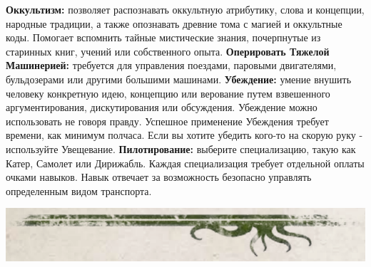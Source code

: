 \documentclass[letterpaper,twocolumn,openany, twoside, 11pt, usenames]{cocbook}
\begin{document}
\begin{fullcocpaperbox}{}{}
\begin{multicols}{3}
  \smallbreak
  \textbf{Оккультизм:} позволяет распознавать оккультную атрибутику, слова и концепции, народные традиции, а также опознавать древние тома с магией и оккультные коды. Помогает вспомнить тайные мистические знания, почерпнутые из старинных книг, учений или собственного опыта.
  \smallbreak
  \textbf{Оперировать Тяжелой Машинерией:} требуется для управления поездами, паровыми двигателями, бульдозерами или другими большими машинами.
  \smallbreak
  \textbf{Убеждение:} умение внушить человеку конкретную идею, концепцию или верование путем взвешенного аргументирования, дискутирования или обсуждения. Убеждение можно использовать не говоря правду. Успешное применение Убеждения требует времени, как минимум полчаса. Если вы хотите убедить кого-то на скорую руку - используйте Увещевание.
  \smallbreak
  \textbf{Пилотирование:} выберите специализацию, такую как Катер, Самолет или Дирижабль. Каждая специализация требует отдельной оплаты очками навыков. Навык отвечает за возможность безопасно управлять определенным видом транспорта.
  \smallbreak
  \end{multicols}
  \includegraphics[width=\linewidth]{img/bottom.png}
\end{fullcocpaperbox}
\end{document}
